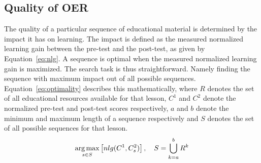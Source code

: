 \subsection{Quality of OER}
The quality of a particular sequence of educational material is determined by
the impact it has on learning. The impact is defined as the measured normalized
learning gain between the pre-test and the post-test, as given by
Equation~\eqref{eq:nlg}. A sequence is optimal when the measured normalized
learning gain is maximized. The search task is thus straightforward. Namely
finding the sequence with maximum impact out of all possible sequences.
Equation~\eqref{eq:optimality} describes this mathematically, where $R$
denotes the set of all educational resources available for that lesson, $C^1$
and $C^2$ denote the normalized pre-test and post-test scores respectively, $a$
and $b$ denote the minimum and maximum length of a sequence respectively and
$S$ denotes the set of all possible sequences for that lesson.
\begin{equation}
	\label{eq:optimality}
	\operatorname*{arg\,max}_{s \in S} \left[ nlg(C^1, C^2_s) \right],
	\quad S = \bigcup_{k = a}^{b} R^k
\end{equation}
